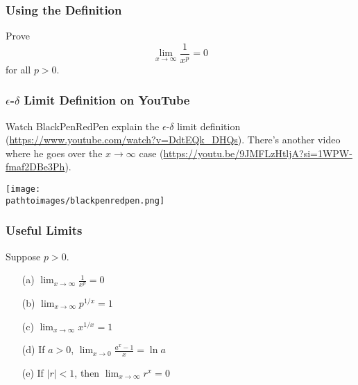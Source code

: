 \documentclass{beamer}
\newcommand{\pathtoimages}{/Users/charlesrambo/Desktop/Bootcamp24/Images}
\begin{document}
\begin{frame}[t]
\frametitle{Using the Definition}
\begin{Example}
Prove
$$
\displaystyle\lim_{x\to\infty} \frac{1}{x^p} = 0
$$
for all $p > 0$.
\end{Example}
\end{frame}

\begin{frame}
\frametitle{$\epsilon$-$\delta$ Limit Definition on YouTube}
Watch BlackPenRedPen explain the $\epsilon$-$\delta$ limit definition {\tiny(\url{https://www.youtube.com/watch?v=DdtEQk_DHQs})}. There's another video where he goes over the $x\to\infty$ case {\tiny(\url{https://youtu.be/9JMFLzHtljA?si=1WPW-fmaf2DBe3Ph})}.
\begin{center}
\texttt{[image: \\pathtoimages/blackpenredpen.png]}
\end{center}
\end{frame}


\begin{frame}
\frametitle{Useful Limits}
\begin{Theorem}
Suppose $p > 0$.
\begin{enumerate}
\item[(a)] $\displaystyle\lim_{x\to\infty} \frac{1}{x^p} = 0$
\item[(b)] $\displaystyle\lim_{x\to\infty} p^{1/x} = 1$
\item[(c)] $\displaystyle\lim_{x\to\infty} x^{1/x} = 1$
\item[(d)] If $ a > 0$, $\displaystyle\lim_{x\to 0} \frac{a^x - 1}{x} = \ln a$
\item[(e)] If $|r| < 1$, then $\displaystyle\lim_{x\to\infty} r^x = 0$
\end{enumerate}
\end{Theorem}
\end{frame}
\end{document}
